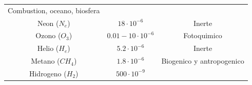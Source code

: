 \documentclass[]{book}
\begin{document}
\begin{longtable}[]{@{}ccc@{}}
\begin{minipage}[t]{0.28\columnwidth}
Combustion, oceano, biosfera\strut
\end{minipage}\tabularnewline
\begin{minipage}[t]{0.15\columnwidth}\centering
Neon (\(N_e\))\strut
\end{minipage} & \begin{minipage}[t]{0.48\columnwidth}\centering
\(18 \cdot10^{-6}\)\strut
\end{minipage} & \begin{minipage}[t]{0.28\columnwidth}\centering
Inerte\strut
\end{minipage}\tabularnewline
\begin{minipage}[t]{0.15\columnwidth}\centering
Ozono (\(O_3\))\strut
\end{minipage} & \begin{minipage}[t]{0.48\columnwidth}\centering
\(0.01-10 \cdot10^{-6}\)\strut
\end{minipage} & \begin{minipage}[t]{0.28\columnwidth}\centering
Fotoquimico\strut
\end{minipage}\tabularnewline
\begin{minipage}[t]{0.15\columnwidth}\centering
Helio (\(H_e\))\strut
\end{minipage} & \begin{minipage}[t]{0.48\columnwidth}\centering
\(5.2 \cdot10^{-6}\)\strut
\end{minipage} & \begin{minipage}[t]{0.28\columnwidth}\centering
Inerte\strut
\end{minipage}\tabularnewline
\begin{minipage}[t]{0.15\columnwidth}\centering
Metano (\(CH_4\))\strut
\end{minipage} & \begin{minipage}[t]{0.48\columnwidth}\centering
\(1.8 \cdot10^{-6}\)\strut
\end{minipage} & \begin{minipage}[t]{0.28\columnwidth}\centering
Biogenico y antropogenico\strut
\end{minipage}\tabularnewline
\begin{minipage}[t]{0.15\columnwidth}\centering
Hidrogeno (\(H_2\))\strut
\end{minipage} & \begin{minipage}[t]{0.48\columnwidth}\centering
\(500 \cdot10^{-9}\)\strut
\end{minipage} & \begin{minipage}[t]{0.28\columnwidth}\centering

\end{minipage}
\end{longtable}
\end{document}
